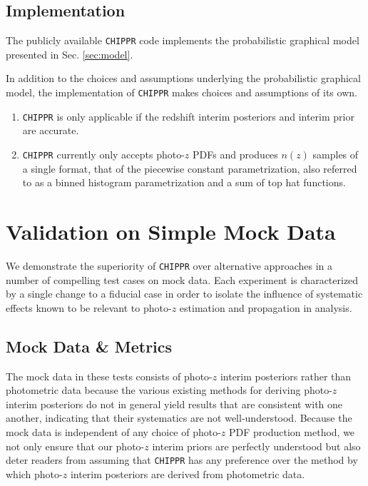 \documentclass[iop]{emulateapj}
\newcommand{\chippr}{\texttt{CHIPPR} }
\begin{document}
\subsection{Implementation}
\label{sec:implementation}

The publicly available \chippr code implements the probabilistic graphical 
model presented in Sec. \ref{sec:model}.  

In addition to the choices and assumptions underlying the probabilistic 
graphical model, the implementation of \chippr makes choices and assumptions of 
its own.

\begin{enumerate}
	\item \chippr is only applicable if the redshift interim posteriors and 
interim prior are accurate.
	\item \chippr currently only accepts photo-$z$ PDFs and produces $n(z)$ 
samples of a single format, that of the piecewise constant parametrization, 
also referred to as a binned histogram parametrization and a sum of top hat 
functions.
\end{enumerate}

\section{Validation on Simple Mock Data}
\label{sec:validation}

We demonstrate the superiority of \chippr over alternative approaches in a 
number of compelling test cases on mock data.  Each experiment is characterized 
by a single change to a fiducial case in order to isolate the influence of 
systematic effects known to be relevant to photo-$z$ estimation and propagation 
in analysis.  

\subsection{Mock Data \& Metrics}
\label{sec:validintro}

The mock data in these tests consists of photo-$z$ interim posteriors rather 
than photometric data because the various existing methods for deriving 
photo-$z$ interim posteriors do not in general yield results that are 
consistent with one another, indicating that their systematics are not 
well-understood.  Because the mock data is independent of any choice of 
photo-$z$ PDF production method, we not only ensure that our photo-$z$ interim 
priors are perfectly understood but also deter readers from assuming that 
\chippr has any preference over the method by which photo-$z$ interim 
posteriors are derived from photometric data.
\end{document}
